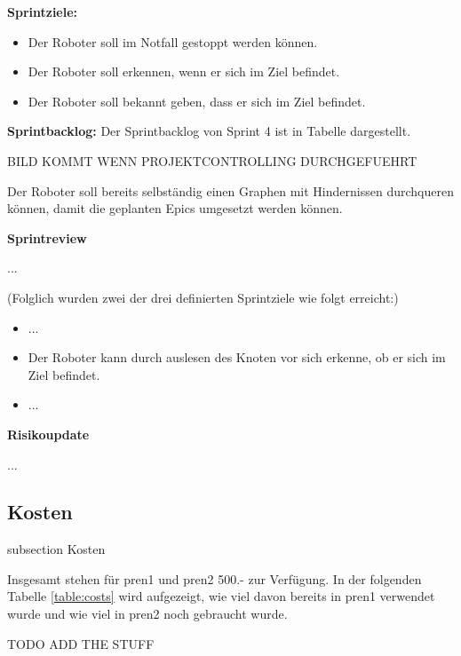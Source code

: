 \textbf{Sprintziele:}
\begin{itemize}
    \item Der Roboter soll im Notfall gestoppt werden können.
    \item Der Roboter soll erkennen, wenn er sich im Ziel befindet.
    \item Der Roboter soll bekannt geben, dass er sich im Ziel befindet.
\end{itemize}

\textbf{Sprintbacklog:} Der Sprintbacklog von Sprint 4 ist in Tabelle 
dargestellt.

BILD KOMMT WENN PROJEKTCONTROLLING DURCHGEFUEHRT


Der Roboter soll bereits selbständig einen Graphen mit Hindernissen durchqueren können, damit die geplanten Epics umgesetzt werden können.


\textbf{Sprintreview}

...


(Folglich wurden zwei der drei definierten Sprintziele wie folgt erreicht:)
\begin{itemize}
    \item ...
    \item Der Roboter kann durch auslesen des Knoten vor sich erkenne, ob er sich im Ziel befindet.
    \item ...
\end{itemize}


\textbf{Risikoupdate}

...

\newpage

\subsection{Kosten}\label{kosten}
    {subsection}
    {Kosten}

Insgesamt stehen für \acrshort{pren1} und \acrshort{pren2} 500.- zur Verfügung. In der folgenden Tabelle \ref{table:costs} wird aufgezeigt, wie viel davon bereits in \acrshort{pren1} verwendet wurde und wie viel in \acrshort{pren2} noch gebraucht wurde.

TODO ADD THE STUFF

